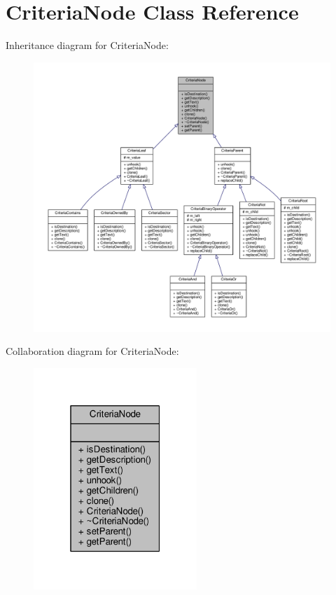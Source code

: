 \hypertarget{classCriteriaNode}{}\section{Criteria\+Node Class Reference}
\label{classCriteriaNode}


Inheritance diagram for Criteria\+Node\+:
\nopagebreak
\begin{figure}[H]
\begin{center}
\leavevmode
\includegraphics[width=350pt]{d0/d3d/classCriteriaNode__inherit__graph}
\end{center}
\end{figure}


Collaboration diagram for Criteria\+Node\+:
\nopagebreak
\begin{figure}[H]
\begin{center}
\leavevmode
\includegraphics[width=175pt]{d2/d41/classCriteriaNode__coll__graph}
\end{center}
\end{figure}
